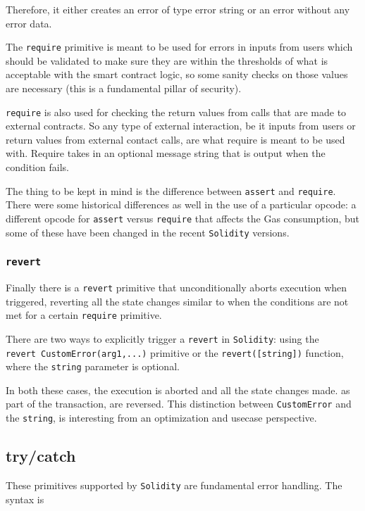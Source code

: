 Therefore, it either creates an error of type error string or an error
without any error data.

The \texttt{require} primitive is meant to be used for errors in inputs
from users which should be validated to make sure they are within the
thresholds of what is acceptable with the smart contract logic, so some
sanity checks on those values are necessary (this is a fundamental
pillar of security).

\texttt{require} is also used for checking the return values from calls
that are made to external contracts. So any type of external
interaction, be it inputs from users or return values from external
contact calls, are what require is meant to be used with. Require takes
in an optional message string that is output when the condition fails.

The thing to be kept in mind is the difference between \texttt{assert}
and \texttt{require}. There were some historical differences as well in
the use of a particular opcode: a different opcode for \texttt{assert}
versus \texttt{require} that affects the Gas consumption, but some of
these have been changed in the recent \texttt{Solidity} versions.

\subsubsection{\texorpdfstring{\texttt{revert}}{revert}}\label{revert}

Finally there is a \texttt{revert} primitive that unconditionally aborts
execution when triggered, reverting all the state changes similar to
when the conditions are not met for a certain \texttt{require}
primitive.

There are two ways to explicitly trigger a \texttt{revert} in
\texttt{Solidity}: using the \texttt{revert\ CustomError(arg1,...)}
primitive or the \texttt{revert({[}string{]})} function, where the
\texttt{string} parameter is optional.

In both these cases, the execution is aborted and all the state changes
made. as part of the transaction, are reversed. This distinction between
\texttt{CustomError} and the \texttt{string}, is interesting from an
optimization and usecase perspective.

\subsection{try/catch}\label{trycatch}

These primitives supported by \texttt{Solidity} are fundamental error
handling. The syntax is

